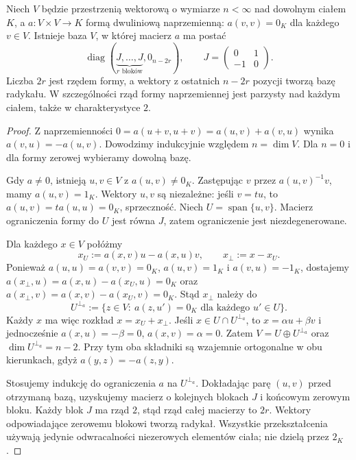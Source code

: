 \begin{twierdzenie}
\label{thm:lin9-alternating-normal}
Niech \(V\) będzie przestrzenią
wektorową o wymiarze \(n<\infty\)
nad dowolnym ciałem \(K\), a
\(a\colon V\times V\to K\)
formą dwuliniową naprzemienną:
\(a(v,v)=0_K\) dla każdego \(v\in V\).
Istnieje baza \(V\), w której
macierz \(a\) ma postać
\[
 \operatorname{diag}(
   \underbrace{J,\ldots,J}_{r\text{ bloków}},
   0_{n-2r}),\qquad
 J=\begin{pmatrix}0&1\\-1&0\end{pmatrix}.
\]
Liczba \(2r\) jest rzędem formy,
a wektory z ostatnich \(n-2r\)
pozycji tworzą bazę radykału.
W szczególności rząd formy
naprzemiennej jest parzysty
nad każdym ciałem, także
w charakterystyce \(2\).
\end{twierdzenie}
\begin{proof}
Z naprzemienności
\(0=a(u+v,u+v)
=a(u,v)+a(v,u)\)
wynika \(a(v,u)=-a(u,v)\).
Dowodzimy indukcyjnie
względem \(n=\dim V\).
Dla \(n=0\) i dla formy
zerowej wybieramy dowolną bazę.

Gdy \(a\ne0\), istnieją
\(u,v\in V\) z \(a(u,v)\ne0_K\).
Zastępując \(v\) przez
\(a(u,v)^{-1}v\), mamy \(a(u,v)=1_K\).
Wektory \(u,v\) są niezależne:
jeśli \(v=tu\), to
\(a(u,v)=t a(u,u)=0_K\),
sprzeczność. Niech
\(U=\operatorname{span}\{u,v\}\).
Macierz ograniczenia formy do \(U\)
jest równa \(J\), zatem
ograniczenie jest niezdegenerowane.

Dla każdego \(x\in V\) połóżmy
\[
 x_U:=a(x,v)u-a(x,u)v,\qquad
 x_\perp:=x-x_U.
\]
Ponieważ \(a(u,u)=a(v,v)=0_K\),
\(a(u,v)=1_K\) i \(a(v,u)=-1_K\),
dostajemy
\(a(x_\perp,u)=a(x,u)-a(x_U,u)=0_K\)
oraz
\(a(x_\perp,v)=a(x,v)-a(x_U,v)=0_K\).
Stąd \(x_\perp\) należy do
\[
 U^{\perp_a}:=
 \{z\in V:\ a(z,u')=0_K
                 \text{ dla każdego }u'\in U\}.
\]
Każdy \(x\) ma więc
rozkład \(x=x_U+x_\perp\).
Jeśli \(x\in U\cap U^{\perp_a}\),
to \(x=\alpha u+\beta v\)
i jednocześnie
\(a(x,u)=-\beta=0\),
\(a(x,v)=\alpha=0\).
Zatem \(V=U\oplus U^{\perp_a}\)
oraz \(\dim U^{\perp_a}=n-2\).
Przy tym oba składniki
są wzajemnie ortogonalne w obu
kierunkach, gdyż
\(a(y,z)=-a(z,y)\).

Stosujemy indukcję do
ograniczenia \(a\) na \(U^{\perp_a}\).
Dokładając parę \((u,v)\) przed
otrzymaną bazą, uzyskujemy
macierz o kolejnych blokach \(J\)
i końcowym zerowym bloku.
Każdy blok \(J\) ma rząd \(2\),
stąd rząd całej macierzy
to \(2r\). Wektory
odpowiadające zerowemu blokowi
tworzą radykał.
Wszystkie przekształcenia
używają jedynie odwracalności
niezerowych elementów ciała;
nie dzielą przez \(2_K\).
\end{proof}


